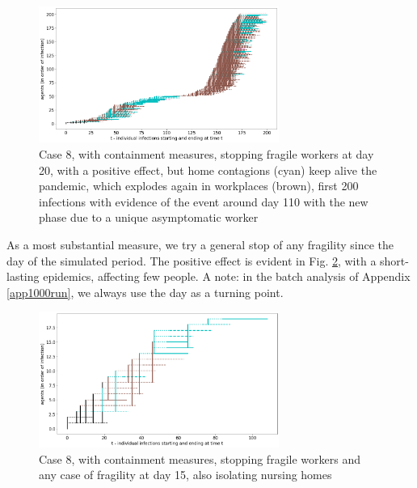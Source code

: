 \documentclass[11pt]{article}
\begin{document}
\begin{figure}[H]
\begin{center}
\includegraphics[width=0.7\textwidth]{withShort1A200.png}%
\caption{Case 8, with containment measures, stopping fragile workers at day 20, with a positive effect, but home contagions (cyan) keep alive the pandemic, which explodes again in workplaces (brown), first 200 infections with evidence of the event around day 110 with the new phase due to a unique asymptomatic worker}
\label{1A200}
\end{center}
\end{figure}

As a most substantial measure, we try a general stop of any fragility since the  day of the simulated period. The positive effect is evident in Fig. \ref{1B}, with a short-lasting epidemics, affecting few people. A note: in the batch analysis of Appendix \ref{app1000run}, we always use the  day as a turning point.

\begin{figure}[H]
\begin{center}
\includegraphics[width=0.7\textwidth]{withShort1B.png}%
\caption{Case 8, with containment measures, stopping fragile workers and any case of fragility at day 15, also isolating nursing homes}
\label{1B}
\end{center}
\end{figure}
\end{document}
